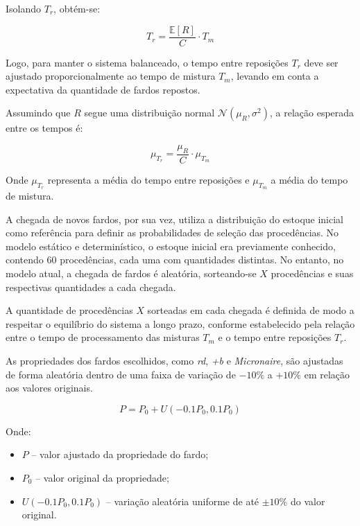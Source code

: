 \documentclass[
    12pt,                %
    openright,           %
    oneside,             %
    a4paper,             %
    english,             %
    spanish,             %
    brazil               %
]{ufscar}
\begin{document}
Isolando \( T_r \), obtém-se:

\begin{equation}
    T_r = \frac{\mathbb{E}[R]}{C} \cdot T_m
\end{equation}

Logo, para manter o sistema balanceado, o tempo entre reposições \( T_r \) deve ser ajustado proporcionalmente ao tempo de mistura \( T_m \), levando em conta a expectativa da quantidade de fardos repostos.

Assumindo que \( R \) segue uma distribuição normal \( \mathcal{N}(\mu_R, \sigma^2) \), a relação esperada entre os tempos é:

\begin{equation}
    \mu_{T_r} = \frac{\mu_R}{C} \cdot \mu_{T_m}
\end{equation}

Onde \( \mu_{T_r} \) representa a média do tempo entre reposições e \( \mu_{T_m} \) a média do tempo de mistura.

A chegada de novos fardos, por sua vez, utiliza a distribuição do estoque inicial como referência para definir as probabilidades de seleção das procedências. No modelo estático e determinístico, o estoque inicial era previamente conhecido, contendo 60 procedências, cada uma com quantidades distintas. No entanto, no modelo atual, a chegada de fardos é aleatória, sorteando-se \( X \) procedências e suas respectivas quantidades a cada chegada.

A quantidade de procedências \( X \) sorteadas em cada chegada é definida de modo a respeitar o equilíbrio do sistema a longo prazo, conforme estabelecido pela relação entre o tempo de processamento das misturas \( T_m \) e o tempo entre reposições \( T_r \).

As propriedades dos fardos escolhidos, como \textit{rd}, \textit{+b} e \textit{Micronaire}, são ajustadas de forma aleatória dentro de uma faixa de variação de \(-10\%\) a \(+10\%\) em relação aos valores originais.

\begin{equation}
    P = P_0 + U(-0.1 P_0, 0.1 P_0)
\end{equation}

Onde:

\begin{itemize}
    \item \( P \) – valor ajustado da propriedade do fardo;
    \item \( P_0 \) – valor original da propriedade;
    \item \( U(-0.1 P_0, 0.1 P_0) \) – variação aleatória uniforme de até \( \pm 10\% \) do valor original.
\end{itemize}
\end{document}
